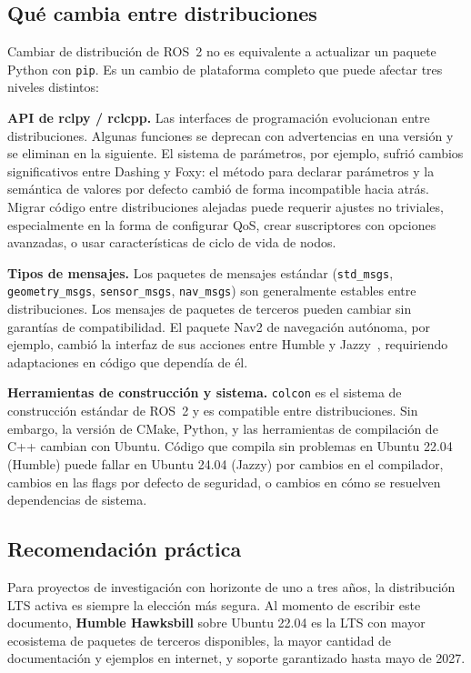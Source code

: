 \subsection{Qué cambia entre distribuciones}

Cambiar de distribución de ROS~2 no es equivalente a actualizar un paquete Python con \texttt{pip}. Es un cambio de plataforma completo que puede afectar tres niveles distintos:

\textbf{API de rclpy / rclcpp.} Las interfaces de programación evolucionan entre distribuciones. Algunas funciones se deprecan con advertencias en una versión y se eliminan en la siguiente. El sistema de parámetros, por ejemplo, sufrió cambios significativos entre Dashing y Foxy: el método para declarar parámetros y la semántica de valores por defecto cambió de forma incompatible hacia atrás. Migrar código entre distribuciones alejadas puede requerir ajustes no triviales, especialmente en la forma de configurar QoS, crear suscriptores con opciones avanzadas, o usar características de ciclo de vida de nodos.

\textbf{Tipos de mensajes.} Los paquetes de mensajes estándar (\texttt{std\_msgs}, \texttt{geometry\_msgs}, \texttt{sensor\_msgs}, \texttt{nav\_msgs}) son generalmente estables entre distribuciones. Los mensajes de paquetes de terceros pueden cambiar sin garantías de compatibilidad. El paquete Nav2 de navegación autónoma, por ejemplo, cambió la interfaz de sus acciones entre Humble y Jazzy~\cite{macenski2020nav2}, requiriendo adaptaciones en código que dependía de él.

\textbf{Herramientas de construcción y sistema.} \texttt{colcon} es el sistema de construcción estándar de ROS~2 y es compatible entre distribuciones. Sin embargo, la versión de CMake, Python, y las herramientas de compilación de C++ cambian con Ubuntu. Código que compila sin problemas en Ubuntu 22.04 (Humble) puede fallar en Ubuntu 24.04 (Jazzy) por cambios en el compilador, cambios en las flags por defecto de seguridad, o cambios en cómo se resuelven dependencias de sistema.

\subsection{Recomendación práctica}

Para proyectos de investigación con horizonte de uno a tres años, la distribución LTS activa es siempre la elección más segura. Al momento de escribir este documento, \textbf{Humble Hawksbill} sobre Ubuntu 22.04 es la LTS con mayor ecosistema de paquetes de terceros disponibles, la mayor cantidad de documentación y ejemplos en internet, y soporte garantizado hasta mayo de 2027.

